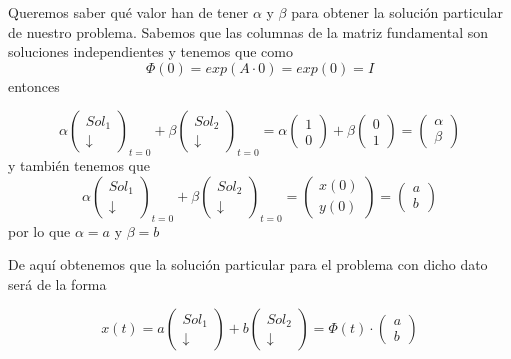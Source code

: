 \begin{example}[(Método II)]
Queremos saber qué valor han de tener $\alpha$ y $\beta$ para obtener la solución particular de nuestro problema. Sabemos que las columnas de la matriz fundamental son soluciones independientes y tenemos que como $$\Phi(0) = exp(A\cdot 0) = exp(0) = I$$ entonces

$$\alpha\begin{pmatrix}
Sol_1\\\downarrow
\end{pmatrix}_{t=0} + \beta\begin{pmatrix}
Sol_2\\\downarrow
\end{pmatrix}_{t=0} = \alpha\begin{pmatrix}
1\\0
\end{pmatrix}+\beta\begin{pmatrix}
0\\1
\end{pmatrix} = \begin{pmatrix}
\alpha\\\beta
\end{pmatrix}$$ y también tenemos que $$\alpha\begin{pmatrix}
Sol_1\\\downarrow
\end{pmatrix}_{t=0} + \beta\begin{pmatrix}
Sol_2\\\downarrow
\end{pmatrix}_{t=0} = \begin{pmatrix}
x(0)\\y(0)
\end{pmatrix} = \begin{pmatrix}
a\\b
\end{pmatrix}$$ por lo que $\alpha = a$ y $\beta = b$

De aquí obtenemos que la solución particular para el problema con dicho dato será de la forma

$$x(t) = a\begin{pmatrix}
Sol_1\\\downarrow
\end{pmatrix} + b\begin{pmatrix}
Sol_2\\\downarrow
\end{pmatrix} = \Phi(t) \cdot \begin{pmatrix}
a\\b
\end{pmatrix}$$
\end{example}

